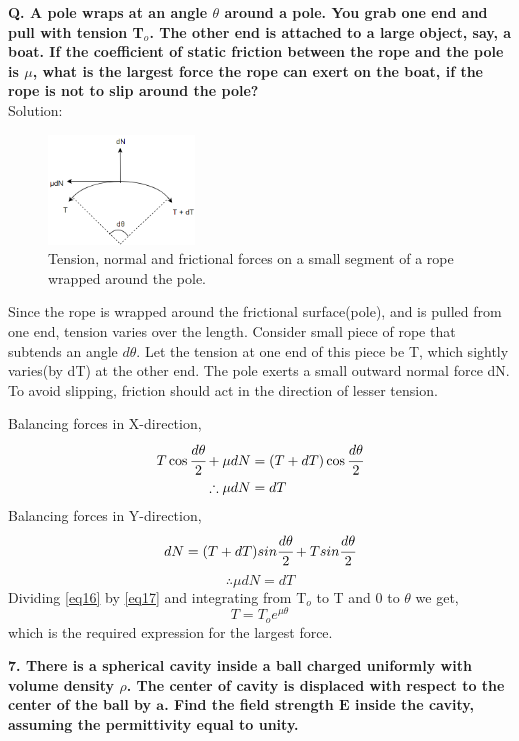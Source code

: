 \begin{tcolorbox}[colback=white]
\textbf{Q. A pole wraps at an angle $\theta$ around a pole. You grab one end and pull with tension T$_o$. The other end is attached to a large object, say, a boat. If the coefficient of static friction between the rope and the pole is $\mu$, what is the largest force the rope can exert on the boat, if the rope is not to slip around the pole?}\\
Solution:
\begin{figure}
     \centering 
     \includegraphics[width = 3.9cm,scale = 0.45]{figures/elecmag/rppl.png}
     \caption{Tension, normal and frictional forces on a small segment of a rope wrapped around the pole. }
     \label{rppl}
 \end{figure}
 Since the rope is wrapped around the frictional surface(pole), and is pulled from one end, tension varies over the length. Consider small piece of rope that subtends an angle $d\theta$. Let the tension at  one end of this piece be T, which sightly varies(by dT) at the other end. The pole exerts a small outward normal force dN. To avoid slipping, friction should act in the direction of lesser tension.
 
Balancing forces in X-direction,
\begin{align} \label{eq16}
  T \cos\cfrac{d\theta}{2} + \mu dN &= (T + dT) \cos\cfrac{d\theta}{2}\nonumber\\
  \therefore \mu dN &= dT   
\end{align}
Balancing forces in Y-direction,
\begin{equation*} 
  dN = (T + dT) sin\cfrac{d\theta}{2} + T sin\cfrac{d\theta}{2}
\end{equation*}
\begin{equation}\label{eq17}
     \therefore \mu dN = dT
\end{equation}
Dividing \ref{eq16} by \ref{eq17} and integrating from T$_o$ to T and 0 to $\theta$ we get,
\[ T = T_o e^{\mu \theta}\]
which is the required expression for the largest force.
\end{tcolorbox}
\newpage
\begin{tcolorbox}
\textbf{7. There is a spherical cavity inside a ball charged uniformly with volume density $\rho$. The center of cavity is displaced with respect to the center of the ball by $\bm{a}$. Find the field strength $\bm{E}$ inside the cavity, assuming the permittivity equal to unity.}
\end{tcolorbox}
